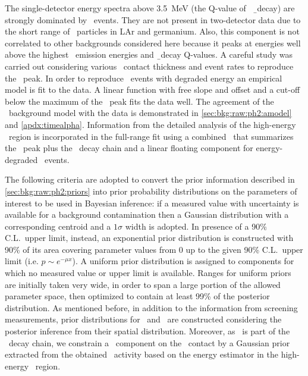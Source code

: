The single-detector energy spectra above 3.5~MeV (the Q-value of \kvz\ \b\ decay) are
strongly dominated by \a\ events. They are not present in two-detector data due to the
short range of \a\ particles in LAr and germanium. Also, this component is not correlated
to other backgrounds considered here because it peaks at energies well above the highest
\g\ emission energies and \b\ decay Q-values. A careful study was carried out considering
various \pplus\ contact thickness and event rates to reproduce the \Po\ peak. In order to
reproduce \a\ events with degraded energy an empirical model is fit to the data. A linear
function with free slope and offset and a cut-off below the maximum of the \Po\ peak fits
the data well. The agreement of the \a\ background model with the data is demonstrated in
\cref{sec:bkg:raw:ph2:amodel} and \cref{apdx:timealpha}. Information from the detailed
analysis of the high-energy \a\ region is incorporated in the full-range fit using a
combined \pdf\ that summarizes the \Po\ peak plus the \Ra\ decay chain and a linear floating
component for energy-degraded \a\ events.

The following criteria are adopted to convert the prior information described in
\cref{sec:bkg:raw:ph2:priors} into prior probability distributions on the parameters of
interest to be used in Bayesian inference: if a measured value with uncertainty is
available for a background contamination then a Gaussian distribution with a corresponding
centroid and a $1\sigma$ width is adopted. In presence of a 90\% C.L.~upper limit,
instead, an exponential prior distribution is constructed with 90\% of its area covering
parameter values from 0 up to the given 90\% C.L.~upper limit (i.e. $p \sim e^{-\mu x}$).
A uniform prior distribution is assigned to components for which no measured value or
upper limit is available. Ranges for uniform priors are initially taken very wide, in
order to span a large portion of the allowed parameter space, then optimized to contain at
least 99\% of the posterior distribution. As mentioned before, in addition to the
information from screening measurements, prior distributions for \kvn\ and \kvz\ are
constructed considering the posterior inference from their spatial distribution. Moreover,
as \Bih\ is part of the \Ra\ decay chain, we constrain a \Bih\ component on the \pplus\
contact by a Gaussian prior extracted from the obtained \Ra{}ctivity based on the energy
estimator in the high-energy \a\ region.

